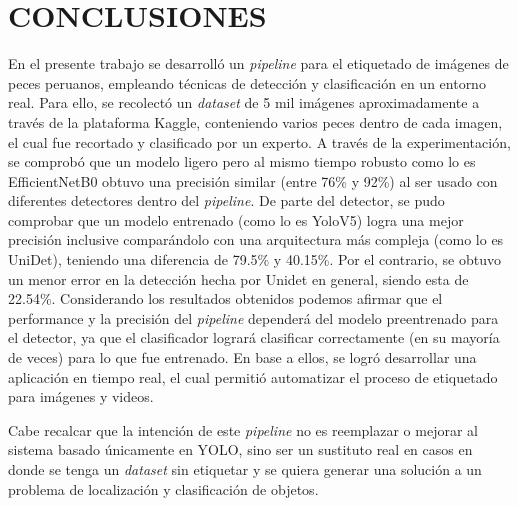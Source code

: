 \chapter*{\center \Large CONCLUSIONES} 

En el presente trabajo se desarrolló un \textit{pipeline} para el
etiquetado de imágenes de peces peruanos, empleando técnicas de detección y 
clasificación en un entorno real. Para ello, se recolectó un 
\textit{dataset} de 5 mil imágenes aproximadamente a través de la plataforma 
Kaggle, conteniendo varios peces dentro de cada imagen, el cual fue 
recortado y clasificado por un experto. 
A través de la experimentación, se comprobó que un modelo 
ligero pero al mismo tiempo robusto como lo es EfficientNetB0 obtuvo una 
precisión similar (entre 76\% y 92\%) al ser usado con diferentes detectores 
dentro del \textit{pipeline}. 
De parte del detector, se pudo comprobar que un modelo entrenado (como lo es YoloV5) 
logra una mejor precisión inclusive comparándolo con una arquitectura más compleja 
(como lo es UniDet), teniendo una diferencia de 79.5\% y 40.15\%. Por el contrario, 
se obtuvo un menor error en la detección hecha por Unidet en general, siendo esta de 
22.54\%. 
\newline
\newline
Considerando los resultados obtenidos podemos afirmar que el performance y 
la precisión del \textit{pipeline} dependerá del modelo preentrenado para el detector, 
ya que el clasificador logrará clasificar correctamente (en su mayoría de veces) para lo 
que fue entrenado. En base a ellos, se logró desarrollar una aplicación en tiempo real, 
el cual permitió automatizar el proceso de etiquetado para imágenes y videos.

Cabe recalcar que la intención de este \textit{pipeline} no es reemplazar o mejorar al 
sistema basado únicamente en YOLO, sino ser un sustituto real en casos en donde 
se tenga un \textit{dataset} sin etiquetar y se quiera generar una solución a un 
problema de localización y clasificación de objetos. 


